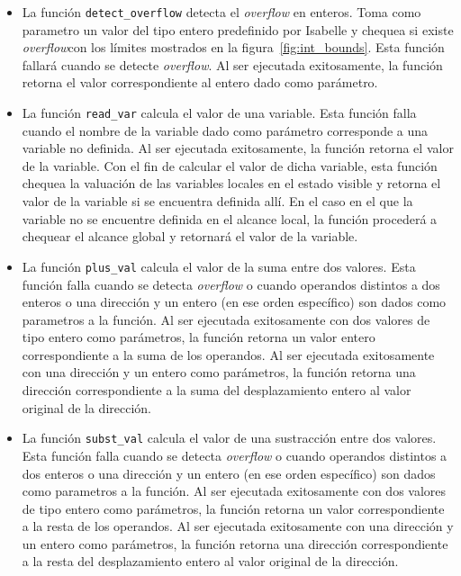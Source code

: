 \begin{itemize}
\item{La función \verb|detect_overflow| detecta el \textit{overflow} en enteros.
Toma como parametro un valor del tipo entero predefinido por Isabelle y chequea si existe \textit{overflow}con los límites mostrados en la figura~\ref{fig:int_bounds}.
Esta función fallará cuando se detecte \textit{overflow}.
Al ser ejecutada exitosamente, la función retorna el valor correspondiente al entero dado como parámetro.}

\item{La función \verb|read_var| calcula el valor de una variable.
Esta función falla cuando el nombre de la variable dado como parámetro corresponde a una variable no definida.
Al ser ejecutada exitosamente, la función retorna el valor de la variable.
Con el fin de calcular el valor de dicha variable, esta función chequea la valuación de las variables locales en el estado visible y retorna el valor de la variable si se encuentra definida allí.
En el caso en el que la variable no se encuentre definida en el alcance local, la función procederá a chequear el alcance global y retornará el valor de la variable.}

\item{La función \verb|plus_val| calcula el valor de la suma entre dos valores.
Esta función falla cuando se detecta \textit{overflow} o cuando operandos distintos a dos enteros o una dirección y un entero (en ese orden específico) son dados como parametros a la función.
Al ser ejecutada exitosamente con dos valores de tipo entero como parámetros, la función retorna un valor entero correspondiente a la suma de los operandos.
Al ser ejecutada exitosamente con una dirección y un entero como parámetros, la función retorna una dirección correspondiente a la suma del desplazamiento entero al valor original de la dirección.}

\item{La función \verb|subst_val| calcula el valor de una sustracción entre dos valores.
Esta función falla cuando se detecta \textit{overflow} o cuando operandos distintos a dos enteros o una dirección y un entero (en ese orden específico) son dados como parametros a la función.
Al ser ejecutada exitosamente con dos valores de tipo entero como parámetros, la función retorna un valor correspondiente a la resta de los operandos.
Al ser ejecutada exitosamente con una dirección y un entero como parámetros, la función retorna una dirección correspondiente a la resta del desplazamiento entero al valor original de la dirección.}


\end{itemize}
